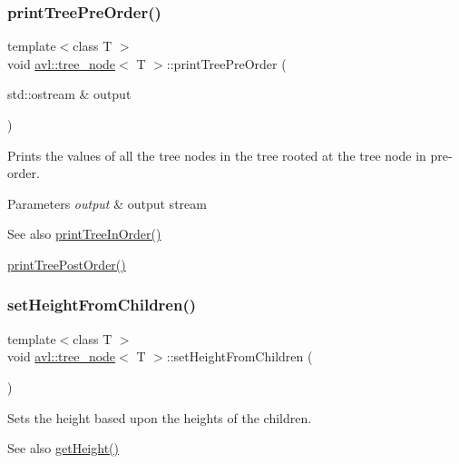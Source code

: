 \subsubsection{\texorpdfstring{print\+Tree\+Pre\+Order()}{printTreePreOrder()}}
{\footnotesize\ttfamily template$<$class T $>$ \\
void \hyperlink{classavl_1_1tree__node}{avl\+::tree\+\_\+node}$<$ T $>$\+::print\+Tree\+Pre\+Order (\begin{DoxyParamCaption}\item[{std\+::ostream \&}]{output }\end{DoxyParamCaption})}

Prints the values of all the tree nodes in the tree rooted at the tree node in pre-\/order. 
\begin{DoxyParams}{Parameters}
{\em output} & output stream \\
\hline
\end{DoxyParams}
\begin{DoxySeeAlso}{See also}
\hyperlink{classavl_1_1tree__node_a51af0430883561e9d3293cb63e78003c}{print\+Tree\+In\+Order()} 

\hyperlink{classavl_1_1tree__node_adb0751fd04db456d5afdbe5c898da41c}{print\+Tree\+Post\+Order()} 
\end{DoxySeeAlso}
\mbox{\label{classavl_1_1tree__node_a5e3b8788433571c4b8462d2cf2d689b9}} 
\subsubsection{\texorpdfstring{set\+Height\+From\+Children()}{setHeightFromChildren()}}
{\footnotesize\ttfamily template$<$class T $>$ \\
void \hyperlink{classavl_1_1tree__node}{avl\+::tree\+\_\+node}$<$ T $>$\+::set\+Height\+From\+Children (\begin{DoxyParamCaption}{ }\end{DoxyParamCaption})}

Sets the height based upon the heights of the children. \begin{DoxySeeAlso}{See also}
\hyperlink{classavl_1_1tree__node_ab298d8df03ff6414ff7280bbdbb16e8a}{get\+Height()} 
\end{DoxySeeAlso}
\mbox{\label{classavl_1_1tree__node_acb0fbbc7cca1f2b18e72fb728be23979}} 
